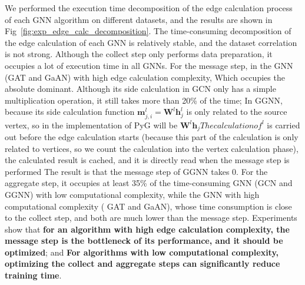 We performed the execution time decomposition of the edge calculation process of each GNN algorithm on different datasets,
and the results are shown in Fig~\ref{fig:exp_edge_calc_decomposition}.
The time-consuming decomposition of the edge calculation of each GNN is relatively stable, 
and the dataset correlation is not strong. Although the collect step only performs data preparation,
it occupies a lot of execution time in all GNNs. For the message step, in the GNN (GAT and GaAN) with high edge calculation complexity, 
Which occupies the absolute dominant. Although its side calculation in GCN only has a simple multiplication operation, it still takes more than 20\% of the time; 
In GGNN, because its side calculation function $\boldsymbol{m}_{j,i }^l=\boldsymbol{W}^l\boldsymbol{h}_{j}^l$ is only related to the source vertex, 
so in the implementation of PyG will be $\boldsymbol{W}^l\boldsymbol{h}_j The calculation of ^l$ is carried out before the edge calculation starts
(because this part of the calculation is only related to vertices, so we count the calculation into the vertex calculation phase),
the calculated result is cached, and it is directly read when the message step is performed The result is that the message step of GGNN takes 0.
For the aggregate step, it occupies at least 35\% of the time-consuming GNN (GCN and GGNN) with low computational complexity,
while the GNN with high computational complexity ( GAT and GaAN), whose time consumption is close to the collect step,
and both are much lower than the message step. Experiments show that \textbf{for an algorithm with high edge calculation complexity,
the message step is the bottleneck of its performance, and it should be optimized}; and \textbf{For algorithms with low computational complexity,
optimizing the collect and aggregate steps can significantly reduce training time}.


